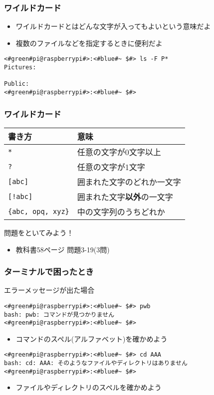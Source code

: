 \begin{frame}[fragile]
    \frametitle{ワイルドカード}
    \begin{itemize}
        \item ワイルドカードとはどんな文字が入ってもよいという意味だよ
        \item 複数のファイルなどを指定するときに便利だよ
    \end{itemize}
    \begin{lstlisting}[title=ワイルドカードの使い方の例]
<#green#pi@raspberrypi#>:<#blue#~ $#> ls -F P*
Pictures:
            
Public:
<#green#pi@raspberrypi#>:<#blue#~ $#>
    \end{lstlisting}
\end{frame}

\begin{frame}
    \frametitle{ワイルドカード}
    \begin{tabular}{ll} \hline
        書き方 & 意味 \\ \hline
        \texttt{*} & 任意の文字が0文字以上 \\
        \texttt{?}      & 任意の文字が1文字 \\
        \texttt{[abc]}  & 囲まれた文字のどれか一文字\\
        \texttt{[!abc]} & 囲まれた文字{\bf 以外}の一文字\\
        \texttt{\{abc, opq, xyz\}} & 中の文字列のうちどれか\\ \hline
    \end{tabular}
\end{frame}

\begin{frame}
    \begin{exampleblock}{問題をといてみよう！}
        \begin{itemize}
            \item 教科書58ページ 問題3-19(3問)
        \end{itemize}
    \end{exampleblock} 
\end{frame}

\begin{frame}[fragile]
    \frametitle{ターミナルで困ったとき}
    エラーメッセージが出た場合
    \begin{lstlisting}
<#green#pi@raspberrypi#>:<#blue#~ $#> pwb
bash: pwb: コマンドが見つかりません
<#green#pi@raspberrypi#>:<#blue#~ $#> 
        \end{lstlisting}
    \begin{itemize}
        \item コマンドのスペル(アルファベット)を確かめよう
    \end{itemize}
    \begin{lstlisting}
<#green#pi@raspberrypi#>:<#blue#~ $#> cd AAA
bash: cd: AAA: そのようなファイルやディレクトリはありません
<#green#pi@raspberrypi#>:<#blue#~ $#> 
        \end{lstlisting}
    \begin{itemize}
        \item ファイルやディレクトリのスペルを確かめよう
    \end{itemize}
\end{frame}

